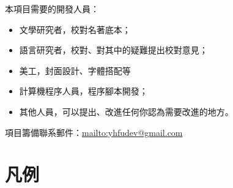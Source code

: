 本項目需要的開發人員：

\begin{itemize}
  \item 文學研究者，校對名著底本；
  \item 語言研究者，校對、對其中的疑難提出校對意見；
  \item 美工，封面設計、字體搭配等
  \item 計算機程序人員，程序腳本開發；%
  \item 其他人員，可以提出、改進任何你認為需要改進的地方。
\end{itemize}


項目籌備聯系郵件：\url{mailto:yhfudev@gmail.com}


\section*{凡例}


\begin{showcontents}{}

\jpmShowZhuInfo

\end{showcontents}


